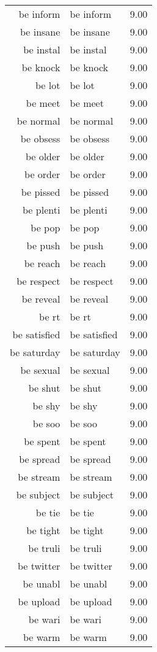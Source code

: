 \begin{table}[ht]
\begin{tabular}{rlr}
  be inform & be inform & 9.00 \\ 
  be insane & be insane & 9.00 \\ 
  be instal & be instal & 9.00 \\ 
  be knock & be knock & 9.00 \\ 
  be lot & be lot & 9.00 \\ 
  be meet & be meet & 9.00 \\ 
  be normal & be normal & 9.00 \\ 
  be obsess & be obsess & 9.00 \\ 
  be older & be older & 9.00 \\ 
  be order & be order & 9.00 \\ 
  be pissed & be pissed & 9.00 \\ 
  be plenti & be plenti & 9.00 \\ 
  be pop & be pop & 9.00 \\ 
  be push & be push & 9.00 \\ 
  be reach & be reach & 9.00 \\ 
  be respect & be respect & 9.00 \\ 
  be reveal & be reveal & 9.00 \\ 
  be rt & be rt & 9.00 \\ 
  be satisfied & be satisfied & 9.00 \\ 
  be saturday & be saturday & 9.00 \\ 
  be sexual & be sexual & 9.00 \\ 
  be shut & be shut & 9.00 \\ 
  be shy & be shy & 9.00 \\ 
  be soo & be soo & 9.00 \\ 
  be spent & be spent & 9.00 \\ 
  be spread & be spread & 9.00 \\ 
  be stream & be stream & 9.00 \\ 
  be subject & be subject & 9.00 \\ 
  be tie & be tie & 9.00 \\ 
  be tight & be tight & 9.00 \\ 
  be truli & be truli & 9.00 \\ 
  be twitter & be twitter & 9.00 \\ 
  be unabl & be unabl & 9.00 \\ 
  be upload & be upload & 9.00 \\ 
  be wari & be wari & 9.00 \\ 
  be warm & be warm & 9.00 \\ 

\end{tabular}
\end{table}
